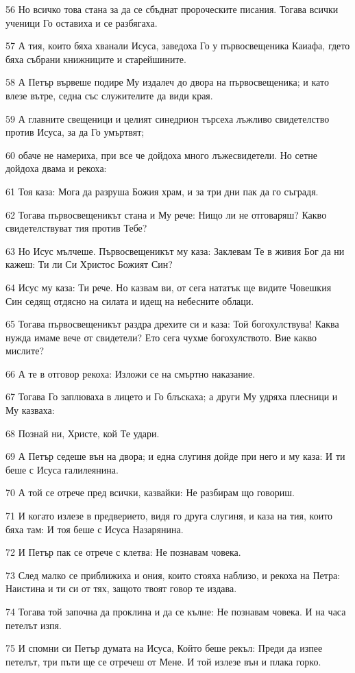 \par 56 Но всичко това стана за да се сбъднат пророческите писания. Тогава всички ученици Го оставиха и се разбягаха.
\par 57 А тия, които бяха хванали Исуса, заведоха Го у първосвещеника Каиафа, гдето бяха събрани книжниците и старейшините.
\par 58 А Петър вървеше подире Му издалеч до двора на първосвещеника; и като влезе вътре, седна със служителите да види края.
\par 59 А главните свещеници и целият синедрион търсеха лъжливо свидетелство против Исуса, за да Го умъртвят;
\par 60 обаче не намериха, при все че дойдоха много лъжесвидетели. Но сетне дойдоха двама и рекоха:
\par 61 Тоя каза: Мога да разруша Божия храм, и за три дни пак да го съградя.
\par 62 Тогава първосвещеникът стана и Му рече: Нищо ли не отговаряш? Какво свидетелствуват тия против Тебе?
\par 63 Но Исус мълчеше. Първосвещеникът му каза: Заклевам Те в живия Бог да ни кажеш: Ти ли Си Христос Божият Син?
\par 64 Исус му каза: Ти рече. Но казвам ви, от сега нататък ще видите Човешкия Син седящ отдясно на силата и идещ на небесните облаци.
\par 65 Тогава първосвещеникът раздра дрехите си и каза: Той богохулствува! Каква нужда имаме вече от свидетели? Ето сега чухме богохулството. Вие какво мислите?
\par 66 А те в отговор рекоха: Изложи се на смъртно наказание.
\par 67 Тогава Го заплюваха в лицето и Го блъскаха; а други Му удряха плесници и Му казваха:
\par 68 Познай ни, Христе, кой Те удари.
\par 69 А Петър седеше вън на двора; и една слугиня дойде при него и му каза: И ти беше с Исуса галилеянина.
\par 70 А той се отрече пред всички, казвайки: Не разбирам що говориш.
\par 71 И когато излезе в предверието, видя го друга слугиня, и каза на тия, които бяха там: И тоя беше с Исуса Назарянина.
\par 72 И Петър пак се отрече с клетва: Не познавам човека.
\par 73 След малко се приближиха и ония, които стояха наблизо, и рекоха на Петра: Наистина и ти си от тях, защото твоят говор те издава.
\par 74 Тогава той започна да проклина и да се кълне: Не познавам човека. И на часа петелът изпя.
\par 75 И спомни си Петър думата на Исуса, Който беше рекъл: Преди да изпее петелът, три пъти ще се отречеш от Мене. И той излезе вън и плака горко.

